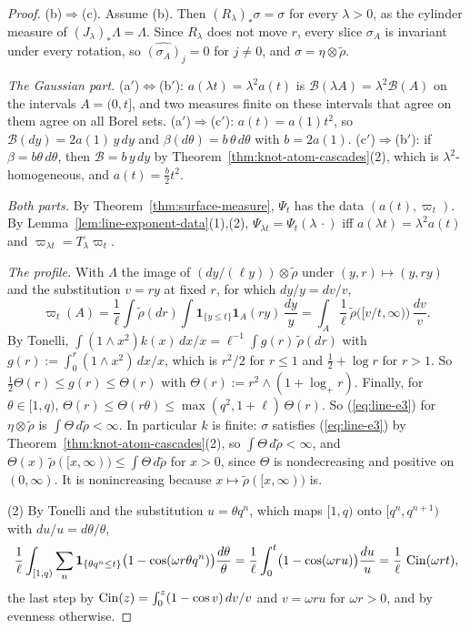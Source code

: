 \begin{proof}
(b)$\Rightarrow$(c). Assume (b). Then
$(R_\lambda)_*\sigma = \sigma$ for every $\lambda > 0$, as the cylinder measure of
$(J_\lambda)_*\Lambda = \Lambda$. Since $R_\lambda$ does not move $r$, every slice $\sigma_A$ is
invariant under every rotation, so $\widehat{(\sigma_A)}_j = 0$ for $j \ne 0$, and
$\sigma = \eta \otimes \tilde\rho$.

\emph{The Gaussian part.} (a$'$)$\Leftrightarrow$(b$'$): $a(\lambda t) = \lambda^2a(t)$ is
$\mathcal{B}(\lambda A) = \lambda^2\mathcal{B}(A)$ on the intervals $A = (0,t]$, and two measures
finite on these intervals that agree on them agree on all Borel sets. (a$'$)$\Rightarrow$(c$'$):
$a(t) = a(1)t^2$, so $\mathcal{B}(dy) = 2a(1)\,y\,dy$ and $\beta(d\theta) = b\,\theta\,d\theta$
with $b = 2a(1)$. (c$'$)$\Rightarrow$(b$'$): if $\beta = b\theta\,d\theta$, then
$\mathcal{B} = b\,y\,dy$ by Theorem~\ref{thm:knot-atom-cascades}(2), which is
$\lambda^2$-homogeneous, and $a(t) = \tfrac b2t^2$.

\emph{Both parts.} By Theorem~\ref{thm:surface-measure}, $\Psi_t$ has the data $(a(t), \varpi_t)$.
By Lemma~\ref{lem:line-exponent-data}(1),(2), $\Psi_{\lambda t} = \Psi_t(\lambda\,\cdot)$ iff
$a(\lambda t) = \lambda^2a(t)$ and $\varpi_{\lambda t} = T_\lambda\varpi_t$.

\emph{The profile.} With $\Lambda$ the image of $(dy/(\ell y)) \otimes \tilde\rho$ under
$(y,r) \mapsto (y, ry)$ and the substitution $v = ry$ at fixed $r$, for which $dy/y = dv/v$,
\[
  \varpi_t(A) = \frac1\ell\int\tilde\rho(dr)\int\mathbf 1_{\{y \le t\}}\mathbf 1_A(ry)\,\frac{dy}{y}
  = \int_A\frac1\ell\,\tilde\rho\bigl([v/t, \infty)\bigr)\,\frac{dv}{v}.
\]
By Tonelli, $\int(1 \wedge x^2)k(x)\,dx/x = \ell^{-1}\int g(r)\,\tilde\rho(dr)$ with
$g(r) := \int_0^r(1 \wedge x^2)\,dx/x$, which is $r^2/2$ for $r \le 1$ and $\tfrac12 + \log r$ for
$r > 1$. So $\tfrac12\Theta(r) \le g(r) \le \Theta(r)$ with $\Theta(r) := r^2 \wedge (1 + \log_+r)$. Finally, for
$\theta \in [1,q)$, $\Theta(r) \le \Theta(r\theta) \le \max(q^2, 1 + \ell)\,\Theta(r)$. So (\ref{eq:line-e3}) for
$\eta \otimes \tilde\rho$ is $\int \Theta\,d\tilde\rho < \infty$.
In particular $k$ is finite: $\sigma$ satisfies (\ref{eq:line-e3}) by Theorem~\ref{thm:knot-atom-cascades}(2),
so $\int \Theta\,d\tilde\rho < \infty$, and $\Theta(x)\,\tilde\rho([x,\infty)) \le \int \Theta\,d\tilde\rho$ for
$x > 0$, since $\Theta$ is nondecreasing and positive on $(0,\infty)$. It is nonincreasing because
$x \mapsto \tilde\rho([x,\infty))$ is.

(2) By Tonelli and the substitution $u = \theta q^n$, which maps $[1,q)$ onto $[q^n,q^{n+1})$ with
$du/u = d\theta/\theta$,
\[
  \frac1\ell\int_{[1,q)}\sum_n\mathbf 1_{\{\theta q^n \le t\}}\bigl(1 - \cos(\omega r\theta q^n)\bigr)
  \frac{d\theta}{\theta}
  = \frac1\ell\int_0^t\bigl(1 - \cos(\omega ru)\bigr)\frac{du}{u} = \frac1\ell\,\operatorname{Cin}(\omega rt),
\]
the last step by $\operatorname{Cin}(z) = \int_0^z(1 - \cos v)\,dv/v$ and $v = \omega ru$ for $\omega r > 0$, and
by evenness otherwise.


\end{proof}
